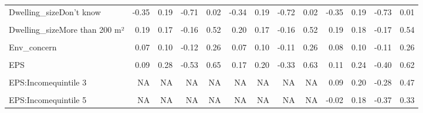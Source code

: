 \begin{table}
\begin{tabular}[t]{lrrrrrrrrrrrr}
Dwelling\_sizeDon't know & -0.35 & 0.19 & -0.71 & 0.02 & -0.34 & 0.19 & -0.72 & 0.02 & -0.35 & 0.19 & -0.73 & 0.01\\
\cellcolor{gray!10}{Dwelling\_sizeLess than 25 m²} & \cellcolor{gray!10}{0.32} & \cellcolor{gray!10}{0.35} & \cellcolor{gray!10}{-0.41} & \cellcolor{gray!10}{0.95} & \cellcolor{gray!10}{0.32} & \cellcolor{gray!10}{0.34} & \cellcolor{gray!10}{-0.41} & \cellcolor{gray!10}{0.95} & \cellcolor{gray!10}{0.31} & \cellcolor{gray!10}{0.35} & \cellcolor{gray!10}{-0.44} & \cellcolor{gray!10}{0.97}\\
Dwelling\_sizeMore than 200 m² & 0.19 & 0.17 & -0.16 & 0.52 & 0.20 & 0.17 & -0.16 & 0.52 & 0.19 & 0.18 & -0.17 & 0.54\\
\cellcolor{gray!10}{Rural} & \cellcolor{gray!10}{0.19} & \cellcolor{gray!10}{0.10} & \cellcolor{gray!10}{0.00} & \cellcolor{gray!10}{0.40} & \cellcolor{gray!10}{0.20} & \cellcolor{gray!10}{0.11} & \cellcolor{gray!10}{-0.01} & \cellcolor{gray!10}{0.41} & \cellcolor{gray!10}{0.19} & \cellcolor{gray!10}{0.11} & \cellcolor{gray!10}{-0.01} & \cellcolor{gray!10}{0.39}\\
Env\_concern & 0.07 & 0.10 & -0.12 & 0.26 & 0.07 & 0.10 & -0.11 & 0.26 & 0.08 & 0.10 & -0.11 & 0.26\\
\cellcolor{gray!10}{Gov\_support} & \cellcolor{gray!10}{11.93} & \cellcolor{gray!10}{2.78} & \cellcolor{gray!10}{8.34} & \cellcolor{gray!10}{19.84} & \cellcolor{gray!10}{12.05} & \cellcolor{gray!10}{2.90} & \cellcolor{gray!10}{8.31} & \cellcolor{gray!10}{20.88} & \cellcolor{gray!10}{12.03} & \cellcolor{gray!10}{2.89} & \cellcolor{gray!10}{8.41} & \cellcolor{gray!10}{20.63}\\
EPS & 0.09 & 0.28 & -0.53 & 0.65 & 0.17 & 0.20 & -0.33 & 0.63 & 0.11 & 0.24 & -0.40 & 0.62\\
\cellcolor{gray!10}{EPS:Incomequintile 2} & \cellcolor{gray!10}{NA} & \cellcolor{gray!10}{NA} & \cellcolor{gray!10}{NA} & \cellcolor{gray!10}{NA} & \cellcolor{gray!10}{NA} & \cellcolor{gray!10}{NA} & \cellcolor{gray!10}{NA} & \cellcolor{gray!10}{NA} & \cellcolor{gray!10}{0.12} & \cellcolor{gray!10}{0.19} & \cellcolor{gray!10}{-0.25} & \cellcolor{gray!10}{0.50}\\
EPS:Incomequintile 3 & NA & NA & NA & NA & NA & NA & NA & NA & 0.09 & 0.20 & -0.28 & 0.47\\
\cellcolor{gray!10}{EPS:Incomequintile 4} & \cellcolor{gray!10}{NA} & \cellcolor{gray!10}{NA} & \cellcolor{gray!10}{NA} & \cellcolor{gray!10}{NA} & \cellcolor{gray!10}{NA} & \cellcolor{gray!10}{NA} & \cellcolor{gray!10}{NA} & \cellcolor{gray!10}{NA} & \cellcolor{gray!10}{0.18} & \cellcolor{gray!10}{0.18} & \cellcolor{gray!10}{-0.16} & \cellcolor{gray!10}{0.56}\\
EPS:Incomequintile 5 & NA & NA & NA & NA & NA & NA & NA & NA & -0.02 & 0.18 & -0.37 & 0.33\\
\bottomrule
\end{tabular}
\end{table}
